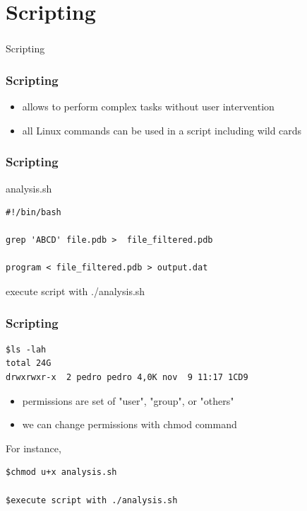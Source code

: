 \section{Scripting}
\begin{frame}[fragile]
	\frametitle{}
\begin{center}
{\Huge
Scripting
}
\end{center}

\end{frame}


\begin{frame}
	\frametitle{Scripting}

\begin{itemize}
\item allows to perform complex tasks without user intervention
\item all Linux commands can be used in a script including wild cards

\end{itemize}

\end{frame}

\begin{frame}[fragile]
	\frametitle{Scripting}

\begin{block}{analysis.sh}
\begin{verbatim}
#!/bin/bash

grep 'ABCD' file.pdb >  file_filtered.pdb 

program < file_filtered.pdb > output.dat

\end{verbatim}
\end{block}

execute script with ./analysis.sh

\end{frame}

\begin{frame}[fragile]
	\frametitle{Scripting}

\begin{verbatim}
$ls -lah
total 24G
drwxrwxr-x  2 pedro pedro 4,0K nov  9 11:17 1CD9
\end{verbatim}

\begin{itemize}
\item permissions are set of "user", "group", or "others"
\item we can change permissions with chmod command
\end{itemize}

For instance, 

\begin{verbatim}
$chmod u+x analysis.sh

$execute script with ./analysis.sh
\end{verbatim}

\end{frame}

